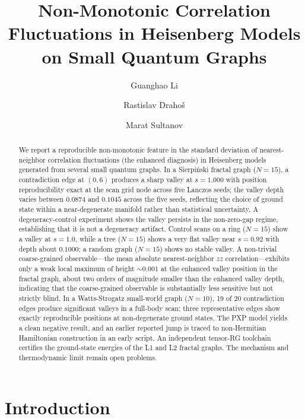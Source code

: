 \documentclass[aps,prb,reprint,superscriptaddress]{revtex4-2}
\begin{document}
\title{Non-Monotonic Correlation Fluctuations in Heisenberg Models on Small Quantum Graphs}
\author{Guanghao Li}
\author{Rastislav Draho\v{s}}
\author{Marat Sultanov}

\begin{abstract}
We report a reproducible non-monotonic feature in the standard deviation of nearest-neighbor correlation fluctuations (the enhanced diagnosis) in Heisenberg models generated from several small quantum graphs. In a Sierpi\'{n}ski fractal graph ($N=15$), a contradiction edge at $(0,6)$ produces a sharp valley at $s=1.000$ with position reproducibility exact at the scan grid node across five Lanczos seeds; the valley depth varies between $0.0874$ and $0.1045$ across the five seeds, reflecting the choice of ground state within a near-degenerate manifold rather than statistical uncertainty. A degeneracy-control experiment shows the valley persists in the non-zero-gap regime, establishing that it is not a degeneracy artifact. Control scans on a ring ($N=15$) show a valley at $s=1.0$, while a tree ($N=15$) shows a very flat valley near $s=0.92$ with depth about $0.1000$; a random graph ($N=15$) shows no stable valley. A non-trivial coarse-grained observable---the mean absolute nearest-neighbor $zz$ correlation---exhibits only a weak local maximum of height $\sim0.001$ at the enhanced valley position in the fractal graph, about two orders of magnitude smaller than the enhanced valley depth, indicating that the coarse-grained observable is substantially less sensitive but not strictly blind. In a Watts-Strogatz small-world graph ($N=10$), 19 of 20 contradiction edges produce significant valleys in a full-body scan; three representative edges show exactly reproducible positions at non-degenerate ground states. The PXP model yields a clean negative result, and an earlier reported jump is traced to non-Hermitian Hamiltonian construction in an early script. An independent tensor-RG toolchain certifies the ground-state energies of the L1 and L2 fractal graphs. The mechanism and thermodynamic limit remain open problems.
\end{abstract}

\maketitle

\section{Introduction}
\end{document}

